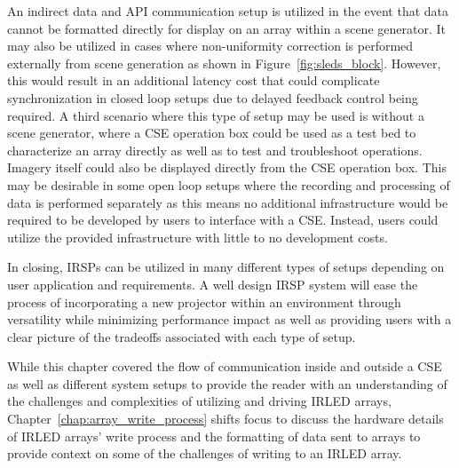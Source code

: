         An indirect data and API communication setup is utilized in the event that data cannot be formatted directly for display on an array within a scene generator. It may also be utilized in cases where non-uniformity correction is performed externally from scene generation as shown in Figure~\ref{fig:sleds_block}. However, this would result in an additional latency cost that could complicate synchronization in closed loop setups due to delayed feedback control being required. A third scenario where this type of setup may be used is without a scene generator, where a CSE operation box could be used as a test bed to characterize an array directly as well as to test and troubleshoot operations. Imagery itself could also be displayed directly from the CSE operation box. This may be desirable in some open loop setups where the recording and processing of data is performed separately as this means no additional infrastructure would be required to be developed by users to interface with a CSE. Instead, users could utilize the provided infrastructure with little to no development costs.

        In closing, IRSPs can be utilized in many different types of setups depending on user application and requirements. A well design IRSP system will ease the process of incorporating a new projector within an environment through versatility while minimizing performance impact as well as providing users with a clear picture of the tradeoffs associated with each type of setup.

        While this chapter covered the flow of communication inside and outside a CSE as well as different system setups to provide the reader with an understanding of the challenges and complexities of utilizing and driving IRLED arrays, Chapter~\ref{chap:array_write_process} shifts focus to discuss the hardware details of IRLED arrays' write process and the formatting of data sent to arrays to provide context on some of the challenges of writing to an IRLED array.
